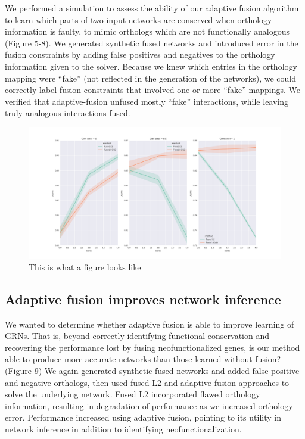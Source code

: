 \documentclass[11pt]{article}
\begin{document}
We performed a simulation to assess the ability of our adaptive fusion algorithm to learn which parts of two input networks are conserved when orthology information is faulty, to mimic orthologs which are not functionally analogous  (Figure 5-8). We generated synthetic fused networks and introduced error in the fusion constraints by adding false positives and negatives to the orthology information given to the solver. Because we knew which entries in the orthology mapping were ``fake'' (not reflected in the generation of the networks), we could correctly label fusion constraints that involved one or more ``fake'' mappings. We verified that adaptive-fusion unfused mostly ``fake'' interactions, while leaving truly analogous interactions fused.

\begin{figure}
\begin{center}
  \includegraphics[scale=0.45]{test_scad_opt_params3.png}
  \caption{\label{fig:figure1} This is what a figure looks like}
  \end{center}
\end{figure}

\subsection{Adaptive fusion improves network inference}
We wanted to determine whether adaptive fusion is able to improve learning of GRNs. That is, beyond correctly identifying functional conservation and recovering the performance lost by fusing neofunctionalized genes, is our method able to produce more accurate networks than those learned without fusion? (Figure 9) We again generated synthetic fused networks and added false positive and negative orthologs, then used fused L2 and adaptive fusion approaches to solve the underlying network. Fused L2 incorporated flawed orthology information, resulting in degradation of performance as we increased orthology error. Performance increased using adaptive fusion, pointing to its utility in network inference in addition to identifying neofunctionalization.



\end{document}
